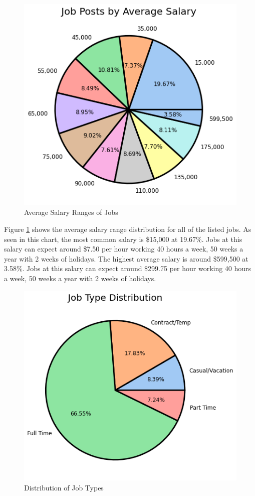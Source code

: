 \documentclass[twoside, 12pt, a4paper]{article}
\begin{document}
\newpage
\begin{figure}[h]
	\centering
	\includegraphics[scale = 0.55]{AverageRanges.png}
	\caption{Average Salary Ranges of Jobs}
	\label{fig:AverageRanges}
\end{figure}

Figure \ref{fig:AverageRanges} shows the average salary range distribution for all of the listed jobs. As seen in this chart, the most common salary is \$15,000 at 19.67\%. Jobs at this salary can expect around \$7.50 per hour working 40 hours a week, 50 weeks a year with 2 weeks of holidays. The highest average salary is around \$599,500 at 3.58\%. Jobs at this salary can expect around \$299.75 per hour working 40 hours a week, 50 weeks a year with 2 weeks of holidays. 

\begin{figure}[h]
	\centering
	\includegraphics[scale = 0.55]{JobType.png}
	\caption{Distribution of Job Types}
	\label{fig:JobTypes}
\end{figure}
\end{document}
